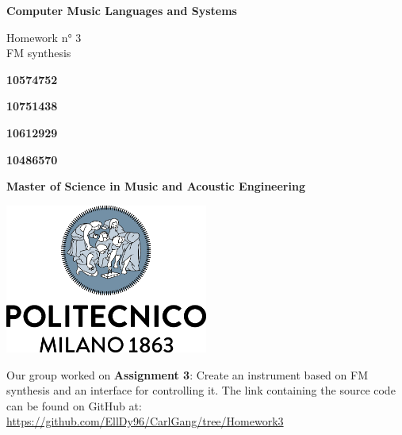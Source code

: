 \documentclass[a4paper,12pt]{report}
\begin{document}
\begin{titlepage}
\begin{center}
    \vspace*{1cm}
    
    \Huge
    \textbf{Computer Music Languages and Systems}
    
    \vspace{0.5cm}
    \LARGE
    Homework n° 3\\
   	FM synthesis

    \vspace{1 cm}
    
    \textbf{10574752}
    
    \vspace{0.5cm}
    
    \textbf{10751438}
     
    \vspace{0.5cm}
    
    \textbf{10612929}
     
    
    \vspace{0.5cm}
    
    \textbf{10486570}
    
    \vspace{0.5cm}
    
    \vfill
  
   
    \date{May 2021}
    \vspace{0.3cm}
    \textbf{Master of Science in Music and Acoustic Engineering}
    
    \vspace{0.8cm}
    
    \includegraphics[width=0.5\textwidth]{logo_positivo.png}
    
\end{center}
\end{titlepage}


\abstract{}
Our group worked on \textbf{Assignment 3}: Create an instrument based on FM synthesis and an interface for controlling it. The link containing the source code can be found on GitHub at: \url{https://github.com/EllDy96/CarlGang/tree/Homework3}
\endabstract{}
\end{document}
